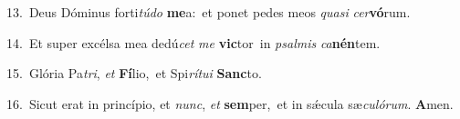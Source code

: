 {\numbfont\textcolor{\numbcolor}{13.}}~Deus Dóminus forti\-\textit{tú}\-\textit{do} \textbf{me}\-a:~\star et ponet pedes meos \textit{qua}\-\textit{si} \textit{cer}\-\textbf{vó}rum.\par
{\numbfont\textcolor{\numbcolor}{14.}}~Et super excélsa mea dedú\textit{cet} \textit{me} \textbf{vic}\-tor~\star in \textit{psal}\-\textit{mis} \textit{ca}\-\textbf{nén}tem.\par
{\numbfont\textcolor{\numbcolor}{15.}}~Glória Pa\-\textit{tri}\-, \textit{et} \textbf{Fí}\-lio,~\star et Spi\-\textit{rí}\-\textit{tu}\textit{i} \textbf{Sanc}\-to.\par
{\numbfont\textcolor{\numbcolor}{16.}}~Sicut erat in princípio, et \textit{nunc}\-, \textit{et} \textbf{sem}\-per,~\star et in sǽcula sæ\-\textit{cu}\-\textit{ló}\textit{rum}. \textbf{A}\-men.\par
